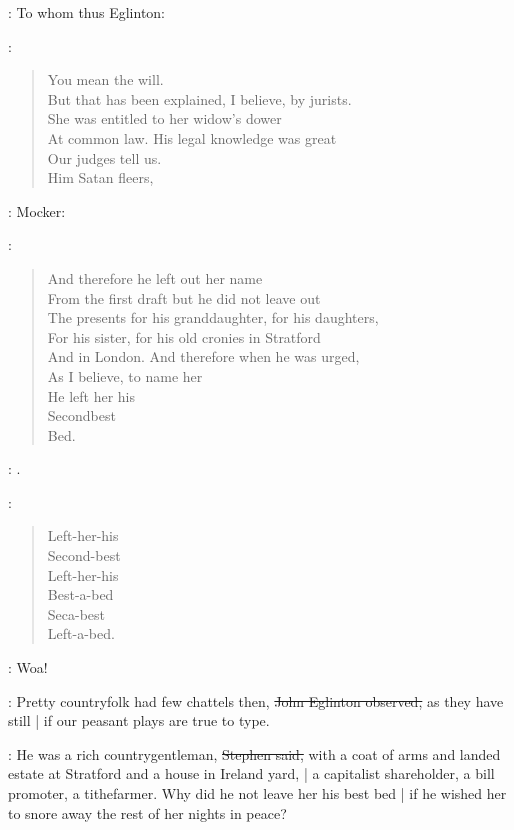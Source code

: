 :
To whom thus Eglinton:

\eglinton:
\begin{verse}
You mean the will. \\
    But that has been explained, I believe, by jurists. \\
    She was entitled to her widow's dower \\
    At common law. His legal knowledge was great \\
    Our judges tell us. \\
        Him Satan fleers, \\
\end{verse}

:
Mocker:

\Stephen:
\begin{verse}
        And therefore he left out her name \\
    From the first draft but he did not leave out \\
    The presents for his granddaughter, for his daughters, \\
    For his sister, for his old cronies in Stratford \\
    And in London. And therefore when he was urged, \\
    As I believe, to name her \\
    He left her his \\
    Secondbest \\
    Bed.
\end{verse}

\StephenInt:
.

\StephenInt:
\begin{verse}
    Left-her-his \\
    Second-best \\
    Left-her-his \\
    Best-a-bed \\
    Seca-best \\
    Left-a-bed.
\end{verse}

\StephenInt:
Woa!

\eglinton:
Pretty countryfolk had few chattels then,
\sout{John Eglinton observed,}
as they have still |
if our peasant plays are true to type.

\Stephen:
He was a rich countrygentleman,
\sout{Stephen said,}
with a coat of arms and landed estate at Stratford and a house in Ireland yard, |
a capitalist shareholder,
a bill promoter,
a tithefarmer.
Why did he not leave her his best bed |
if he wished her to snore away the rest of her nights in peace?

